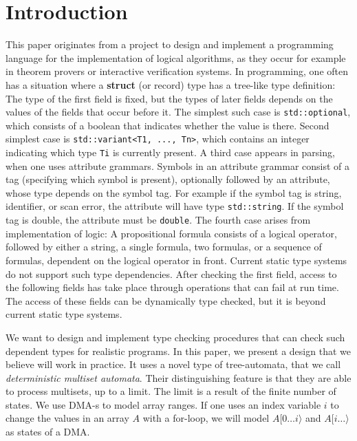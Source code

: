 
\section{Introduction}

This paper originates from a project to design and implement
a programming language for the implementation
of logical algorithms, as they occur for example in theorem provers
or interactive verification systems.
In programming, one often has a situation where a 
{\bf struct} (or record) type has a tree-like type definition:
The type of the first field is fixed, but the 
types of later fields depends on the values of the 
fields that occur before it. 
The simplest such case is \verb|std::optional|, which consists
of a boolean that indicates whether the value is there.
Second simplest case is \verb|std::variant<T1, ..., Tn>|, which contains
an integer indicating which type \verb|Ti| is currently present.
A third case appears in parsing, when one uses attribute grammars.
Symbols in an attribute grammar consist of a tag (specifying
which symbol is present), optionally followed by an attribute, whose
type depends on the symbol tag. For example if the symbol tag is 
string, identifier, or scan error, 
the attribute will have type \verb|std::string|. 
If the symbol tag is double, the attribute must be \verb|double|. 
The fourth case arises from implementation of logic: A propositional
formula consists of a logical operator, followed by either a string, a
single formula, two formulas, or a sequence of formulas,
dependent on the logical operator in front. 
Current static type systems do not support such type dependencies. 
After checking the first field, access to the following fields has take
place through operations that can fail at run time. 
The access of these fields can be dynamically type checked, but
it is beyond current static type systems. 

We want to design and implement type checking
procedures that can check such dependent 
types for realistic programs. In this paper, we present a design
that we believe will work in practice. 
It uses a novel type of tree-automata,
that we call \emph{deterministic multiset automata}. Their
distinguishing feature is that they are able to process multisets, 
up to a limit. The limit is a result of the finite number of states.
We use DMA-s to model array ranges.
If one uses an index variable $ i $ to change the values in an
array $ A $ with a for-loop, we will model $ A[ 0 \ldots i \rangle $ 
and $ A[ i \ldots \rangle $ as states of a DMA.

